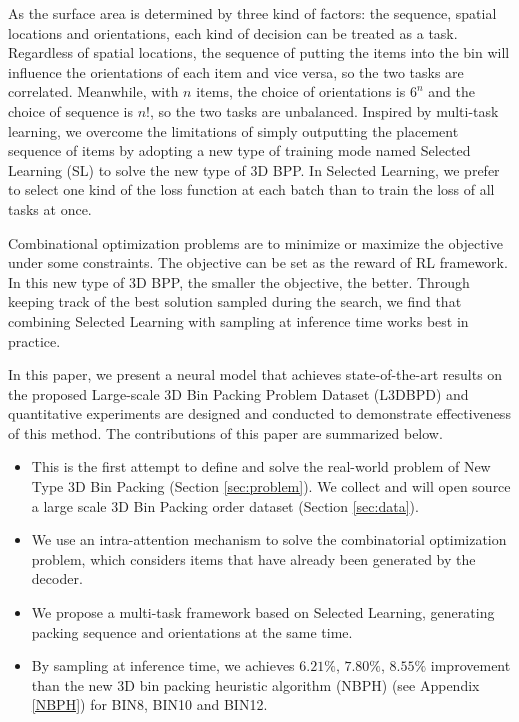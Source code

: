 As the surface area is determined by three kind of factors: the sequence, spatial locations and orientations, each kind of decision can be treated as a task. Regardless of spatial locations, the sequence of putting the items into the bin will influence the orientations of each item and vice versa, so the two tasks are correlated. Meanwhile, with $n$ items, the choice of orientations is $6^n$ and the choice of sequence is $n!$, so the two tasks are unbalanced.
Inspired by multi-task learning, we overcome the limitations of simply outputting the placement sequence of items by adopting a new type of training mode named 
Selected Learning (SL) to solve the new type of 3D BPP. %
In Selected Learning, we prefer to select one kind of the loss function at each batch than to train the loss of all tasks at once. 

Combinational optimization problems are to minimize or maximize the objective under some constraints. The objective can be set as the reward of RL framework. In this new type of 3D BPP, the smaller the objective, the better. Through keeping track of the best solution sampled during the search, we find that combining Selected Learning with sampling at inference time works best in practice.

In this paper, we present a neural model that achieves state-of-the-art results on the proposed Large-scale 3D Bin Packing Problem Dataset (L3DBPD) and 
quantitative experiments are designed and conducted to demonstrate effectiveness of this method. The contributions of this paper are summarized below.
\begin{itemize}
	\item This is the first attempt to define and solve the real-world problem of New Type 3D Bin Packing (Section \ref{sec:problem}).
		We collect and will open source a large scale 3D Bin Packing order dataset (Section \ref{sec:data}).
	\item We use an intra-attention mechanism to solve the combinatorial optimization problem, which considers items that have already been generated by the decoder.  
	\item We propose a multi-task framework based on Selected Learning, generating packing sequence and orientations at the same time.
	\item By sampling at inference time, we achieves $6.21\%$, $7.80\%$, $8.55\%$ improvement than the new 3D bin packing heuristic algorithm (NBPH) (see Appendix \ref{NBPH}) for BIN8, BIN10 and BIN12.
\end{itemize}

